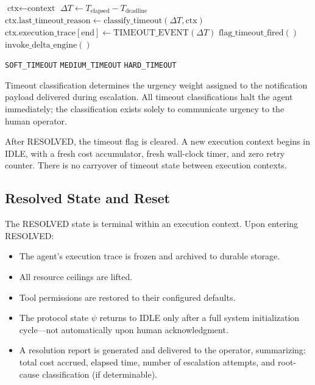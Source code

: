 \begin{algorithm}[htbp]
\caption{Timeout Handling Sequence}
\begin{algorithmic}[1]
  \State $\text{ctx} \leftarrow \text{context}$
  \State $\Delta T \leftarrow T_\text{elapsed} - T_\text{deadline}$
  \State $\text{ctx.last\_timeout\_reason} \leftarrow \text{classify\_timeout}(\Delta T, \text{ctx})$
  \State $\text{ctx.execution\_trace}[\text{end}] \leftarrow \text{TIMEOUT\_EVENT}(\Delta T)$
  \State $\text{flag\_timeout\_fired}()$
  \State $\text{invoke\_delta\_engine}()$
\EndFunction

   \Return \texttt{SOFT\_TIMEOUT}
   \Return \texttt{MEDIUM\_TIMEOUT}
  \Else{} \Return \texttt{HARD\_TIMEOUT}
  \EndIf
\EndFunction
\end{algorithmic}
\end{algorithm}

Timeout classification determines the urgency weight assigned to the notification payload delivered during escalation. All timeout classifications halt the agent immediately; the classification exists solely to communicate urgency to the human operator.

\begin{note}
After RESOLVED, the timeout flag is cleared. A new execution context begins in IDLE, with a fresh cost accumulator, fresh wall-clock timer, and zero retry counter. There is no carryover of timeout state between execution contexts.
\end{note}

\bigskip

\subsection{Resolved State and Reset}

The RESOLVED state is terminal within an execution context. Upon entering RESOLVED:

\begin{itemize}
\item The agent's execution trace is frozen and archived to durable storage.
\item All resource ceilings are lifted.
\item Tool permissions are restored to their configured defaults.
\item The protocol state $\psi$ returns to IDLE only after a full system initialization cycle—not automatically upon human acknowledgment.
\item A resolution report is generated and delivered to the operator, summarizing: total cost accrued, elapsed time, number of escalation attempts, and root-cause classification (if determinable).
\end{itemize}


